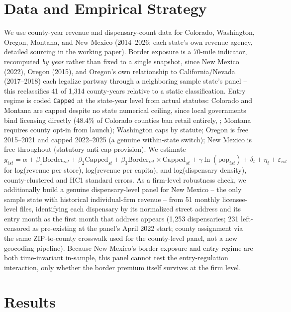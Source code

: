 \documentclass[5p]{elsarticle}
\begin{document}
\section{Data and Empirical Strategy}

We use county-year revenue and dispensary-count data for Colorado, Washington, Oregon, Montana, and New
Mexico (2014--2026; each state's own revenue agency, detailed sourcing in the working paper). Border exposure
is a 70-mile indicator, recomputed \emph{by year} rather than fixed to a single snapshot, since New Mexico
(2022), Oregon (2015), and Oregon's own relationship to California/Nevada (2017--2018) each legalize partway
through a neighboring sample state's panel -- this reclassifies 41 of 1{,}314 county-years relative to a
static classification. Entry regime is coded \texttt{Capped} at the state-year level from actual statutes:
Colorado and Montana are capped despite no state numerical ceiling, since local governments bind licensing
directly (48.4\% of Colorado counties ban retail entirely, \citealp{PayanBrownSong2021}; Montana requires
county opt-in from launch); Washington caps by statute; Oregon is free 2015--2021 and capped 2022--2025 (a
genuine within-state switch); New Mexico is free throughout (statutory anti-cap provision). We estimate
$y_{ist} = \alpha + \beta_1 \text{Border}_{ist} + \beta_2 \text{Capped}_{st} + \beta_3 \text{Border}_{ist}
\times \text{Capped}_{st} + \gamma\ln(\text{pop}_{ist}) + \delta_t + \eta_i + \varepsilon_{ist}$ for
log(revenue per store), log(revenue per capita), and log(dispensary density), county-clustered and HC1
standard errors. As a firm-level robustness check, we additionally build a genuine dispensary-level panel for
New Mexico -- the only sample state with historical individual-firm revenue -- from 51 monthly licensee-level
files, identifying each dispensary by its normalized street address and its entry month as the first month
that address appears (1{,}253 dispensaries; 231 left-censored as pre-existing at the panel's April 2022 start;
county assignment via the same ZIP-to-county crosswalk used for the county-level panel, not a new geocoding
pipeline). Because New Mexico's border exposure and entry regime are both time-invariant in-sample, this panel
cannot test the entry-regulation interaction, only whether the border premium itself survives at the firm
level.

\section{Results}
\end{document}
